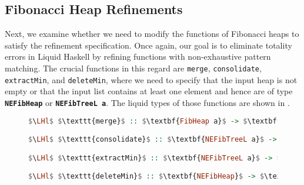 \documentclass{clmthesis}
\begin{document}
\subsection{Fibonacci Heap Refinements}
Next, we examine whether we need to modify the functions of Fibonacci heaps to satisfy the refinement specification. Once again, our goal is to eliminate totality errors in Liquid Haskell by refining functions with non-exhaustive pattern matching. The crucial functions in this regard are \texttt{merge}, \texttt{consolidate}, \texttt{extractMin}, and \texttt{deleteMin}, where we need to specify that the input heap is not empty or that the input list contains at least one element and hence are of type \textbf{\lstinline{NEFibHeap}} or \textbf{\lstinline{NEFibTreeL a}}. The liquid types of those functions are shown in .

\begin{figure}[h]
\begin{lstlisting}[mathescape=true, language=haskell, caption={Liquid Types of \texttt{merge}, \texttt{consolidate}, \texttt{extractMin} and \texttt{deleteMin}.},captionpos=b, label=fig:514]
$\LHl$ $\texttt{merge}$ :: $\textbf{FibHeap a}$ -> $\textbf{NEFibHeap}$ -> $\textbf{NEFibHeap}$ $\LHr$

$\LHl$ $\texttt{consolidate}$ :: $\textbf{NEFibTreeL a}$ -> $\textbf{[NEFibTreeL a]}$ $\LHr$

$\LHl$ $\texttt{extractMin}$ :: $\textbf{NEFibTreeL a}$ -> $\textbf{(FibTree a, [FibTree a])}$ $\LHr$

$\LHl$ $\texttt{deleteMin}$ :: $\textbf{NEFibHeap}$ -> $\textbf{FibHeap a}$ $\LHr$
\end{lstlisting}
\end{figure}
\end{document}
